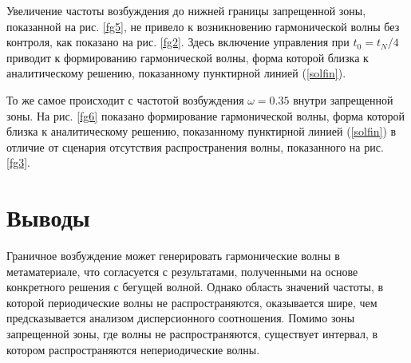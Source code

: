 Увеличение частоты возбуждения до нижней границы запрещенной зоны, показанной на рис. \ref{fg5}, не привело к возникновению гармонической волны без контроля, как показано на рис. \ref{fg2}. Здесь включение управления при $ t_0 = t_N / 4 $ приводит к формированию гармонической волны, форма которой близка к аналитическому решению, показанному пунктирной линией (\ref {solfin}).

То же самое происходит с частотой возбуждения $\omega = 0.35 $ внутри запрещенной зоны. На рис. \ref {fg6} показано формирование гармонической волны, форма которой близка к аналитическому решению, показанному пунктирной линией (\ref {solfin}) в отличие от сценария отсутствия распространения волны, показанного на рис. \ref {fg3}.


\section{Выводы}

Граничное возбуждение может генерировать гармонические волны в метаматериале, что согласуется с результатами, полученными на основе конкретного решения с бегущей волной. Однако область значений частоты, в которой периодические волны не распространяются, оказывается шире, чем предсказывается анализом дисперсионного соотношения. Помимо зоны запрещенной зоны, где волны не распространяются, существует интервал, в котором распространяются непериодические волны.

